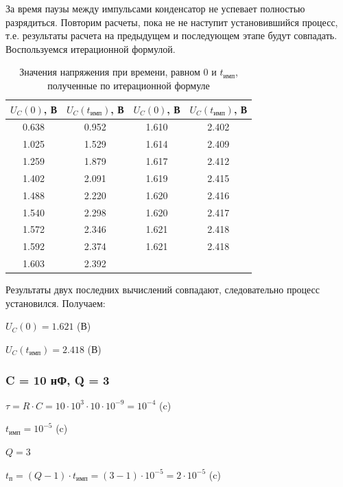 За время паузы между импульсами конденсатор не успевает полностью разрядиться. Повторим расчеты, пока не не наступит установившийся процесс, т.е. результаты расчета на предыдущем и последующем этапе будут совпадать.	Воспользуемся итерационной формулой.
\begin{table}[H]

	\begin{center}
	\caption{Значения напряжения при времени, равном $0$ и $t_\text{имп}$, полученные по итерационной формуле}
	\def\arraystretch{1.2}
	\begin{tabular}{|c|c||c|c|}
		\hline 
		$U_C(0)$, В & $U_C(t_\text{имп})$, В & $U_C(0)$, В & $U_C(t_\text{имп})$, В \\ 
		\hline 
		0.638 & 0.952 & 1.610 & 2.402 \\ 
		\hline 
		1.025 & 1.529 & 1.614 & 2.409 \\ 
		\hline 
		1.259 & 1.879 & 1.617 & 2.412 \\ 
		\hline 
		1.402 & 2.091 & 1.619 & 2.415 \\ 
		\hline 
		1.488 & 2.220 & 1.620 & 2.416 \\
		\hline 
		1.540 & 2.298 & 1.620 & 2.417 \\ 
		\hline 
		1.572 & 2.346 & 1.621 & 2.418 \\ 
		\hline 
		1.592 & 2.374 & 1.621 & 2.418 \\ 
		\hline 
		1.603 & 2.392 & & \\
		\hline
		\end{tabular} 	
		
	\end{center}
\end{table}
	Результаты двух последних вычислений совпадают, следовательно процесс установился. Получаем:
	
	$U_C(0) = 1.621$ (В)	
	
	$U_C(t_\text{имп}) = 2.418$ (В)
	

\subsubsection{C = 10 нФ, Q = 3}

$\tau = R \cdot C = 10 \cdot 10^3 \cdot 10 \cdot 10^{-9} = 10^{-4}$ (c)
		
		$t_\text{имп} = 10^{-5}$ (c)
		
		$Q = 3$
		
		$t_\text{п} = (Q - 1) \cdot t_\text{имп} = (3 - 1) \cdot 10^{-5} = 2 \cdot 10^{-5}$ (c)
		
